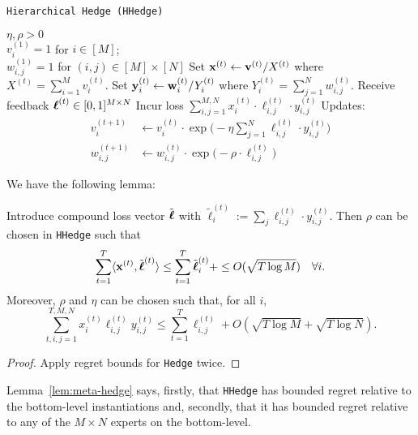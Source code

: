 \begin{algorithm}
   \caption{\texttt{Hierarchical Hedge (HHedge)}}
   \label{alg:meta-hedge}
   \begin{algorithmic}   
   	 $\eta,\rho>0$\\
   	 $v^{(1)}_{i}=1$ for $i\in[M]$;\\ 
   	 $w^{(1)}_{i,j}=1$ for $(i,j)\in[M]\times[N]$
	\STATE Set ${\mathbf x}^{(t)} \leftarrow {\mathbf v}^{(t)}/X^{(t)}$ where $X^{(t)} = \sum_{i=1}^M v^{(t)}_{i}$.
	\STATE Set ${\mathbf y}^{(t)}_{i} \leftarrow {\mathbf w}^{(t)}_{i}/Y^{(t)}_{i}$ where $Y^{(t)}_{i} = \sum_{j=1}^N w^{(t)}_{i,j}$.
	\STATE Receive feedback $\boldsymbol\ell^{(t)}\in [0,1]^{M\times N}$ 
	\STATE Incur loss $\sum_{i,j=1}^{M,N} x^{(t)}_{i}\cdot\ell^{(t)}_{i,j}\cdot y^{(t)}_{i,j}$
	\STATE Updates:
	\begin{align}
		v^{(t+1)}_i & \leftarrow v^{(t)}_{i}\cdot \exp\big(-\eta \sum_{j=1}^N\ell^{(t)}_{i,j}\cdot y^{(t)}_{i,j}\big)
		\\
		w^{(t+1)}_{i,j} & \leftarrow w^{(t)}_{i,j}\cdot \exp\big(-\rho\cdot \ell^{(t)}_{i,j}\big)
	\end{align}
   	\ENDFOR
   	\end{algorithmic}
\end{algorithm}

We have the following lemma:

\begin{lem}\label{lem:meta-hedge}
	Introduce compound loss vector $\tilde{\boldsymbol\ell}$ with $\tilde{\ell}^{(t)}_i := \sum_j \ell^{(t)}_{i,j}\cdot y^{(t)}_{i,j}$. Then $\rho$ can be chosen in \texttt{HHedge} such that
	\begin{equation}
		\sum_{t=1}^T \langle {\mathbf x}^{(t)},\tilde{\boldsymbol\ell}^{(t)}\rangle 
		\leq  \sum_{t=1}^T \tilde{\boldsymbol\ell}^{(t)}_i +
		\leq O(\sqrt{T \log M})\quad\forall i.
	\end{equation}
	Moreover, $\rho$ and $\eta$ can be chosen such that, for all $i$,
	\begin{equation}
		\sum_{t,i,j=1}^{T,M,N} x^{(t)}_{i}\ell^{(t)}_{i,j} y^{(t)}_{i,j}
		\leq \sum_{t=1}^T\ell^{(t)}_{i,j}
		+ O(\sqrt{T \log M} + \sqrt{T \log N}).
	\end{equation}
\end{lem}

\begin{proof}
	Apply regret bounds for \texttt{Hedge} twice.
\end{proof}

Lemma~\ref{lem:meta-hedge} says, firstly, that \texttt{HHedge} has bounded regret relative to the bottom-level instantiations and, secondly, that it has bounded regret relative to any of the $M\times N$ experts on the bottom-level.


